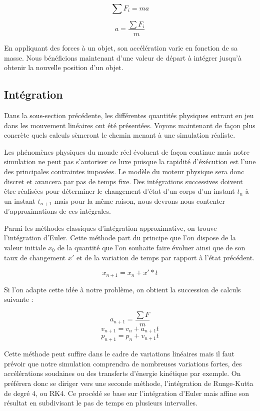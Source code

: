 \documentclass[twocolumn]{article}
\begin{document}
\[\sum F_i = m a\]

\[a = \frac{\sum F_i}{m}\]

En appliquant des forces à un objet, son accélération varie en fonction de sa masse. Nous bénéficions maintenant d'une valeur de départ à intégrer jusqu'à obtenir la nouvelle position d'un objet.

\subsection{Intégration}

Dans la sous-section précédente, les différentes quantités physiques entrant en jeu dans les mouvement linéaires ont été présentées. Voyons maintenant de façon plus concrète quels calculs sèmeront le chemin menant à une simulation réaliste.

Les phénomènes physiques du monde réel évoluent de façon continue mais notre simulation ne peut pas s'autoriser ce luxe puisque la rapidité d'éxécution est l'une des principales contraintes imposées. Le modèle du moteur physique sera donc discret et avancera par pas de temps fixe. Des intégrations successives doivent être réalisées pour déterminer le changement d'état d'un corps d'un instant $t_n$ à un instant $t_{n+1}$ mais pour la même raison, nous devrons nous contenter d'approximations de ces intégrales.

Parmi les méthodes classiques d'intégration approximative, on trouve l'intégration d'Euler. Cette méthode part du principe que l'on dispose de la valeur initiale $x_0$ de la quantité que l'on souhaite faire évoluer ainsi que de son taux de changement $x'$ et de la variation de temps par rapport à l'état précédent.

\[x_{n+1} = x_{n} + x' * t\]

Si l'on adapte cette idée à notre problème, on obtient la succession de calculs suivante :

\[a_{n+1} = \frac{\sum F}{m}\]
\[v_{n+1} = v_n + a_{n+1} t\]
\[p_{n+1} = p_n + v_{n+1} t\]

Cette méthode peut suffire dans le cadre de variations linéaires mais il faut prévoir que notre simulation comprendra de nombreuses variations fortes, des accélérations soudaines ou des transferts d'énergie kinétique par exemple. On préférera donc se diriger vers une seconde méthode, l'intégration de Runge-Kutta de degré 4, ou RK4. Ce procédé se base sur l'intégration d'Euler mais affine son résultat en subdivisant le pas de temps en plusieurs intervalles.
\end{document}
